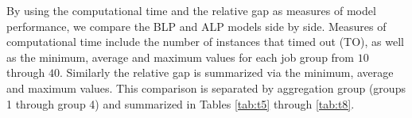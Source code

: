 By using the computational time and the relative gap as measures of model performance, we compare the BLP and ALP models side by side. Measures of computational time include the number of instances that timed out (TO), as well as the minimum, average and maximum values for each job group from $10$ through $40$. Similarly the relative gap is summarized via the minimum, average and maximum values. This comparison is separated by aggregation group (groups 1 through group 4) and summarized in Tables \ref{tab:t5} through \ref{tab:t8}.\\
\begin{table}[h!] \small
\renewcommand{\arraystretch}{1.4} %
\caption{Group 1 - No aggregation (60 instances)}
\label{tab:t5}
\end{table}\\

